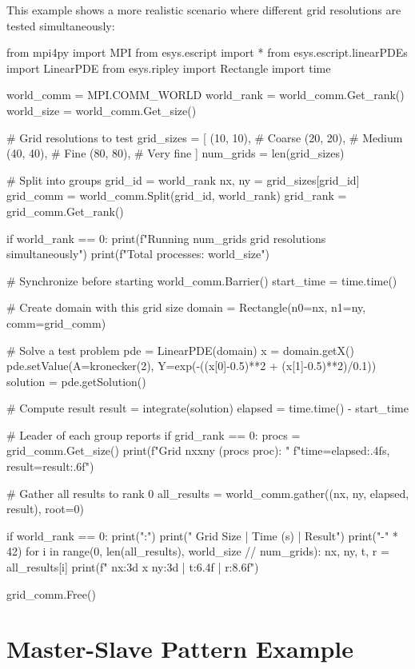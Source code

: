 This example shows a more realistic scenario where different grid resolutions are tested simultaneously:

\begin{python}
from mpi4py import MPI
from esys.escript import *
from esys.escript.linearPDEs import LinearPDE
from esys.ripley import Rectangle
import time

world_comm = MPI.COMM_WORLD
world_rank = world_comm.Get_rank()
world_size = world_comm.Get_size()

# Grid resolutions to test
grid_sizes = [
    (10, 10),   # Coarse
    (20, 20),   # Medium
    (40, 40),   # Fine
    (80, 80),   # Very fine
]
num_grids = len(grid_sizes)

# Split into groups
grid_id = world_rank %
nx, ny = grid_sizes[grid_id]
grid_comm = world_comm.Split(grid_id, world_rank)
grid_rank = grid_comm.Get_rank()

if world_rank == 0:
    print(f"Running {num_grids} grid resolutions simultaneously")
    print(f"Total processes: {world_size}")

# Synchronize before starting
world_comm.Barrier()
start_time = time.time()

# Create domain with this grid size
domain = Rectangle(n0=nx, n1=ny, comm=grid_comm)

# Solve a test problem
pde = LinearPDE(domain)
x = domain.getX()
pde.setValue(A=kronecker(2), Y=exp(-((x[0]-0.5)**2 + (x[1]-0.5)**2)/0.1))
solution = pde.getSolution()

# Compute result
result = integrate(solution)
elapsed = time.time() - start_time

# Leader of each group reports
if grid_rank == 0:
    procs = grid_comm.Get_size()
    print(f"Grid {nx}x{ny} ({procs} proc): "
          f"time={elapsed:.4f}s, result={result:.6f}")

# Gather all results to rank 0
all_results = world_comm.gather((nx, ny, elapsed, result), root=0)

if world_rank == 0:
    print("\nSummary:")
    print("  Grid Size  |  Time (s)  |   Result")
    print("-" * 42)
    for i in range(0, len(all_results), world_size // num_grids):
        nx, ny, t, r = all_results[i]
        print(f"  {nx:3d} x {ny:3d}   |   {t:6.4f}   |  {r:8.6f}")

grid_comm.Free()
\end{python}

\section{Master-Slave Pattern Example}

